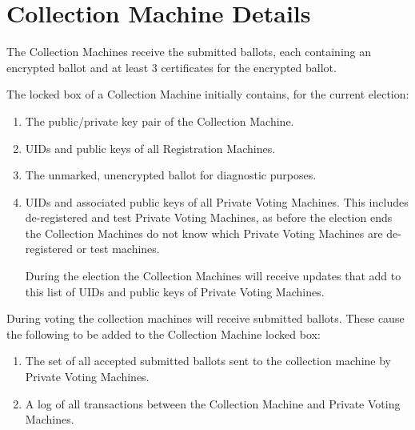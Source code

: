 \documentclass[12pt]{article}
\begin{document}
\section{Collection Machine Details}

The Collection Machines receive the submitted ballots, each containing
an encrypted ballot and at least 3 certificates for the encrypted
ballot.

The locked box of a Collection Machine initially contains, for the
current election:
\begin{enumerate}
\item The public/private key pair of the Collection Machine.
\item UIDs and public keys of all Registration Machines.
\item The unmarked, unencrypted ballot for diagnostic purposes.
\item UIDs and associated public keys of all Private Voting
Machines.  This includes de-registered and test Private Voting
Machines, as before the election ends the
Collection Machines do not know which Private Voting
Machines are de-registered or test machines.

During the election the Collection Machines will receive updates
that add to this list of UIDs and public keys of Private Voting
Machines.
\setcounter{CML-COUNTER}{\value{enumi}}
\end{enumerate}

During voting the collection machines will
receive submitted ballots.  These cause the following to be
added to the Collection Machine locked box:

\begin{enumerate}
\setcounter{enumi}{\value{CML-COUNTER}}
\item The set of all accepted submitted ballots sent to the collection machine
by Private Voting Machines.
\item A log of all transactions between the Collection Machine and
Private Voting Machines.
\setcounter{CML-COUNTER}{\value{enumi}}
\end{enumerate}
\end{document}
